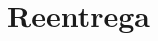 \documentclass[a4paper]{article}
\begin{document}



\section{Reentrega}



\newpage



\end{document}
